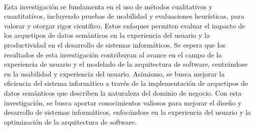 \documentclass[12pt,a4paper]{article}
\begin{document}
\\
Esta investigación se fundamenta en el uso de métodos cualitativos y cuantitativos, incluyendo pruebas de usabilidad y evaluaciones heurísticas, para valorar y otorgar rigor científico. Estos enfoques permiten evaluar el impacto de los arquetipos de datos semánticos en la experiencia del usuario y la productividad en el desarrollo de sistemas informáticos. Se espera que los resultados de esta investigación contribuyan al avance en el campo de la experiencia de usuario y el modelado de la arquitectura de software, centrándose en la usabilidad y experiencia del usuario. Asimismo, se busca mejorar la eficiencia del sistema informático a través de la implementación de arquetipos de datos semánticos que describen la naturaleza del dominio de negocio. Con esta investigación, se busca aportar conocimientos valiosos para mejorar el diseño y desarrollo de sistemas informáticos, enfocándose en la experiencia del usuario y la optimización de la arquitectura de software.

\end{document}
